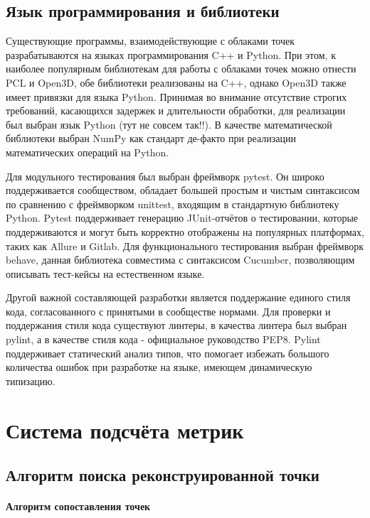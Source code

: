 \section{Язык программирования и библиотеки}

Существующие программы, взаимодействующие с облаками точек разрабатываются на
языках программирования C++ и Python. При этом, к наиболее популярным
библиотекам для работы с облаками точек можно отнести PCL и Open3D, обе
библиотеки реализованы на C++, однако Open3D также имеет привязки для языка
Python. Принимая во внимание отсутствие строгих требований, касающихся задержек
и длительности обработки, для реализации был выбран язык Python (тут не совсем
так!!). В качестве математической библиотеки выбран NumPy как стандарт де-факто
при реализации математических операций на Python.

Для модульного тестирования был выбран фреймворк pytest. Он широко
поддерживается сообществом, обладает большей простым и чистым синтаксисом по
сравнению с фреймворком unittest, входящим в стандартную библиотеку Python.
Pytest поддерживает генерацию JUnit-отчётов о тестировании, которые
поддерживаются и могут быть корректно отображены на популярных платформах, таких
как Allure и Gitlab. Для функционального тестирования выбран фреймворк behave,
данная библиотека совместима с синтаксисом Cucumber, позволяющим описывать
тест-кейсы на естественном языке.

Другой важной составляющей разработки является поддержание единого стиля кода,
согласованного с принятыми в сообществе нормами. Для проверки и поддержания
стиля кода существуют линтеры, в качества линтера был выбран pylint, а в
качестве стиля кода - официальное руководство PEP8. Pylint поддерживает
статический анализ типов, что помогает избежать большого количества ошибок при
разработке на языке, имеющем динамическую типизацию.

\newpage
\chapter{Система подсчёта метрик}

\section{Алгоритм поиска реконструированной точки}

\subsubsection{Алгоритм сопоставления точек}

